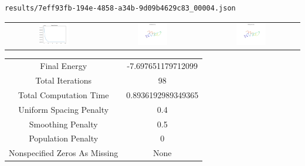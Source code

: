 \documentclass{report}
\begin{document}
\begin{lstlisting}
results/7eff93fb-194e-4858-a34b-9d09b4629c83_00004.json
\end{lstlisting}
\begin{tabular}{ccc}
\includegraphics[width=0.32\textwidth]{7eff93fb-194e-4858-a34b-9d09b4629c83_00004_energies.png}
&
\includegraphics[width=0.32\textwidth]{7eff93fb-194e-4858-a34b-9d09b4629c83_00004_initial_curves.png}
&
\includegraphics[width=0.32\textwidth]{7eff93fb-194e-4858-a34b-9d09b4629c83_00004_estimated_curves.png}
\\
\end{tabular}
\begin{tabular}{cc}
Final Energy&-7.697651179712099\\
Total Iterations&98\\
Total Computation Time&0.8936192989349365\\
Uniform Spacing Penalty&0.4\\
Smoothing Penalty&0.5\\
Population Penalty&0\\
Nonspecified Zeros As Missing&None\\
\end{tabular}
\end{document}
